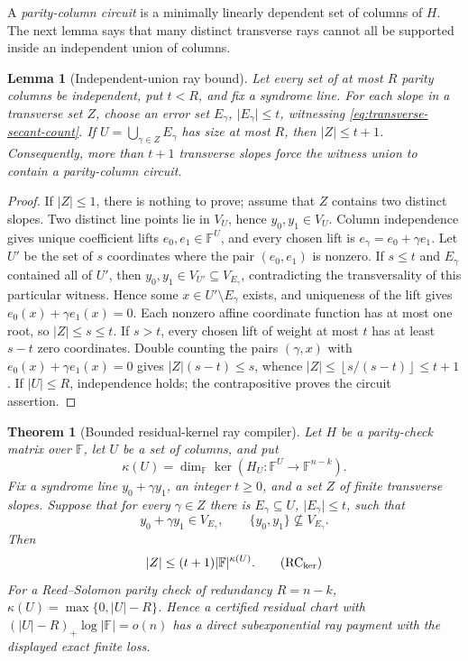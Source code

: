 \documentclass[12pt,a4paper]{amsart}
\numberwithin{equation}{section}
\newtheorem{theorem}{Theorem}[section]
\newtheorem{lemma}[lemma]{Lemma}
\theoremstyle{remark}
\newcommand{\F}{\mathbb F}
\newcommand{\abs}[1]{\lvert #1\rvert}
\newcommand{\floor}[1]{\left\lfloor #1\right\rfloor}
\begin{document}
A \emph{parity-column circuit} is a minimally linearly dependent set of
columns of \(H\).  The next lemma says that many distinct transverse rays
cannot all be supported inside an independent union of columns.

\begin{lemma}[Independent-union ray bound]
\label{lem:independent-union-rays}
Let every set of at most \(R\) parity columns be independent, put
\(t<R\), and fix a syndrome line.  For each slope in a transverse set
\(Z\), choose an error set \(E_\gamma\), \(\abs{E_\gamma}\le t\),
witnessing \eqref{eq:transverse-secant-count}.  If
\(U=\bigcup_{\gamma\in Z}E_\gamma\) has size at most \(R\), then
\(\abs Z\le t+1\).  Consequently, more than \(t+1\) transverse slopes
force the witness union to contain a parity-column circuit.
\end{lemma}

\begin{proof}
If \(\abs Z\le1\), there is nothing to prove; assume that \(Z\) contains
two distinct slopes.  Two distinct line points lie in \(V_U\), hence
\(y_0,y_1\in V_U\).
Column independence gives unique coefficient lifts
\(e_0,e_1\in\F^U\), and every chosen lift is
\(e_\gamma=e_0+\gamma e_1\).  Let \(U'\) be the set of \(s\) coordinates
where the pair \((e_0,e_1)\) is nonzero.  If \(s\le t\) and
\(E_\gamma\) contained all of \(U'\), then
\(y_0,y_1\in V_{U'}\subseteq V_{E_\gamma}\), contradicting the
transversality of this particular witness.  Hence some
\(x\in U'\setminus E_\gamma\) exists, and uniqueness of the lift gives
\(e_0(x)+\gamma e_1(x)=0\).  Each nonzero affine coordinate function has
at most one root, so \(\abs Z\le s\le t\).  If \(s>t\), every chosen lift of
weight at most \(t\) has at least \(s-t\) zero coordinates.  Double
counting the pairs \((\gamma,x)\) with
\(e_0(x)+\gamma e_1(x)=0\) gives
\(\abs Z(s-t)\le s\), whence
\(\abs Z\le\floor{s/(s-t)}\le t+1\).  If \(\abs U\le R\), independence
holds; the contrapositive proves the circuit assertion.
\end{proof}

\begin{theorem}[Bounded residual-kernel ray compiler]
\label{thm:bounded-residual-kernel-ray}
Let \(H\) be a parity-check matrix over \(\F\), let \(U\) be a set of
columns, and put
\[
 \kappa(U)=\dim_\F\ker(H_U:\F^U\longrightarrow\F^{n-k}).
\]
Fix a syndrome line \(y_0+\gamma y_1\), an integer \(t\ge0\), and a set
\(Z\) of finite transverse slopes.  Suppose that for every \(\gamma\in Z\)
there is \(E_\gamma\subseteq U\), \(\abs{E_\gamma}\le t\), such that
\[
 y_0+\gamma y_1\in V_{E_\gamma},\qquad
 \{y_0,y_1\}\not\subseteq V_{E_\gamma}.
\]
Then
\[
                  \abs Z\le(t+1)\abs{\F}^{\kappa(U)}. \tag{RC$_{\rm ker}$}
\]
For a Reed--Solomon parity check of redundancy \(R=n-k\),
\(\kappa(U)=\max\{0,\abs U-R\}\).  Hence a certified residual chart with
\((\abs U-R)_+\log\abs\F=o(n)\) has a direct subexponential ray payment
with the displayed exact finite loss.
\end{theorem}
\end{document}
